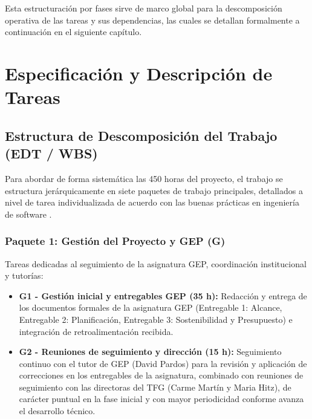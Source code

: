 \documentclass[12pt, a4paper, twoside]{report}
\begin{document}
Esta estructuración por fases sirve de marco global para la descomposición operativa de las tareas y sus dependencias, las cuales se detallan formalmente a continuación en el siguiente capítulo.


\chapter{Especificación y Descripción de Tareas}

\section{Estructura de Descomposición del Trabajo (EDT / WBS)}
Para abordar de forma sistemática las 450 horas del proyecto, el trabajo se estructura jerárquicamente en siete paquetes de trabajo principales, detallados a nivel de tarea individualizada de acuerdo con las buenas prácticas en ingeniería de software \cite{boehm2000software, ieee1058}.

\subsection{Paquete 1: Gestión del Proyecto y GEP (G)}
Tareas dedicadas al seguimiento de la asignatura GEP, coordinación institucional y tutorías:
\begin{itemize}
    \item \textbf{G1 - Gestión inicial y entregables GEP (35 h):} Redacción y entrega de los documentos formales de la asignatura GEP (Entregable 1: Alcance, Entregable 2: Planificación, Entregable 3: Sostenibilidad y Presupuesto) e integración de retroalimentación recibida.
    \item \textbf{G2 - Reuniones de seguimiento y dirección (15 h):} Seguimiento continuo con el tutor de GEP (David Pardos) para la revisión y aplicación de correcciones en los entregables de la asignatura, combinado con reuniones de seguimiento con las directoras del TFG (Carme Martín y Maria Hitz), de carácter puntual en la fase inicial y con mayor periodicidad conforme avanza el desarrollo técnico.
\end{itemize}
\end{document}
